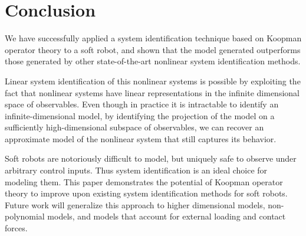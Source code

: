 \section{Conclusion}
\label{sec:conclusion}

We have successfully applied a system identification technique based on Koopman operator theory to a soft robot, and shown that the model generated outperforms those generated by other state-of-the-art nonlinear system identification methods. 

Linear system identification of this nonlinear systems is possible by exploiting the fact that nonlinear systems have linear representations in the infinite dimensional space of observables.
Even though in practice it is intractable to identify an infinite-dimensional model, by identifying the projection of the model on a sufficiently high-dimensional subspace of observables, we can recover an approximate model of the nonlinear system that still captures its behavior.


Soft robots are notoriously difficult to model, but uniquely safe to observe under arbitrary control inputs.
Thus system identification is an ideal choice for modeling them.
This paper demonstrates the potential of Koopman operator theory to improve upon existing system identification methods for soft robots.
Future work will generalize this approach to higher dimensional models, non-polynomial models, and models that account for external loading and contact forces. 







